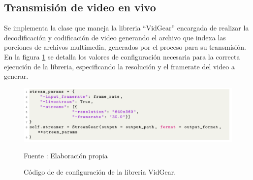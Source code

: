 \subsection{Transmisión de video en vivo}
Se implementa la clase que maneja la libreria ``VidGear'' encargada de realizar la decodificación y codificación de video generando el archivo que indexa las porciones de archivos multimedia, generados por el proceso para su transmisión. En la figura \ref{fig:vidgear} se detalla los valores de configuración necesaria para la correcta ejecución de la libreria, especificando la resolución y el framerate del video a generar.\\

\begin{figure}[H]
    \begin{center}
        \includegraphics[width=16cm]{img/capitulo_5/vidgear.png}
    \end{center}
    \begin{center}
        \caption{Código de de configuración de la libreria VidGear.}
        Fuente : Elaboración propia
        \label{fig:vidgear}
    \end{center}
\end{figure}
